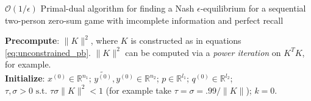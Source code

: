 \documentclass{article} %
\begin{document}

\begin{algorithm}[G_2]
  \caption{$\mathcal{O}(1/\epsilon)$ Primal-dual algorithm for finding a Nash $\epsilon$-equilibrium for a sequential two-person zero-sum game with imcomplete information and perfect recall}
  \textbf{Precompute}: $\|K\|^2$, where $K$ is constructed as in equations \eqref{eq:unconstrained_pb}. $\|K\|^2$ can be computed via a \textit{power iteration} on $K^TK$, for example.\\
  \textbf{Initialize}:
  $x^{(0)} \in \mathbb{R}^{n_1}$; $\tilde{y^{(0)}}, y^{(0)} \in \mathbb{R}^{n_2}$; $p \in \mathbb{R}^{l_1}$; $q^{(0)} \in \mathbb{R}^{l_2}$; 
  $\tau, \sigma > 0 \text{ s.t. }\tau\sigma \|K\|^2 < 1$ (for example take $\tau = \sigma = .99/\|K\|$); $k = 0$.\\
  \label{Tab:algo_simplified}
\end{algorithm}
\end{document}
